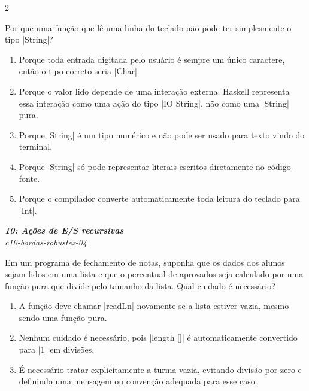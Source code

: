\documentclass[a4paper,10pt,brazil]{article}
\begin{document}
\begin{multicols}{2}
\begin{flushright}
\end{flushright}
Por que uma função que lê uma linha do teclado não pode ter simplesmente o tipo \haskellinline|String|?

\begin{enumerate}
  \item Porque toda entrada digitada pelo usuário é sempre um único caractere, então o tipo correto seria \haskellinline|Char|.

  \item Porque o valor lido depende de uma interação externa. Haskell representa essa interação como uma ação do tipo \haskellinline|IO String|, não como uma \haskellinline|String| pura.

  \item Porque \haskellinline|String| é um tipo numérico e não pode ser usado para texto vindo do terminal.

  \item Porque \haskellinline|String| só pode representar literais escritos diretamente no código-fonte.

  \item Porque o compilador converte automaticamente toda leitura do teclado para \haskellinline|Int|.


\end{enumerate}

\begin{flushright}
  \footnotesize
  \textit{\textbf{10: Ações de E/S recursivas}}\\
  \textit{c10-bordas-robustez-04}\\

\end{flushright}
Em um programa de fechamento de notas, suponha que os dados dos alunos sejam lidos em uma lista e que o percentual de aprovados seja calculado por uma função pura que divide pelo tamanho da lista. Qual cuidado é necessário?

\begin{enumerate}
  \item A função deve chamar \haskellinline|readLn| novamente se a lista estiver vazia, mesmo sendo uma função pura.

  \item Nenhum cuidado é necessário, pois \haskellinline|length []| é automaticamente convertido para \haskellinline|1| em divisões.

  \item É necessário tratar explicitamente a turma vazia, evitando divisão por zero e definindo uma mensagem ou convenção adequada para esse caso.


\end{enumerate}
\end{multicols}
\end{document}
